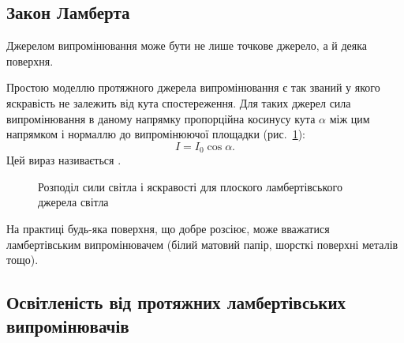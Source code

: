 \subsection*{Закон Ламберта}


Джерелом випромінювання може бути не лише точкове джерело, а й деяка поверхня.


Простою моделлю протяжного джерела випромінювання є так званий   у якого яскравість не залежить від кута спостереження. Для таких джерел сила випромінювання в даному напрямку пропорційна
косинусу кута $\alpha$ між цим напрямком і нормаллю до випромінюючої
площадки (рис.~\ref{pic:Lambert_Law}):
\begin{equation}\label{eq:Lambert_Law}
	I = I_0\cos\alpha.
\end{equation}
Цей вираз називається .

\begin{figure}[h!]\centering%
    \centering
    
    \caption{Розподіл сили світла і яскравості для плоского ламбертівського джерела світла}
    \label{pic:Lambert_Law}
\end{figure}

На практиці будь-яка поверхня, що добре розсіює, може вважатися ламбертівським випромінювачем (білий матовий папір, шорсткі поверхні металів тощо).


\subsection*{Освітленість від протяжних ламбертівських випромінювачів}


